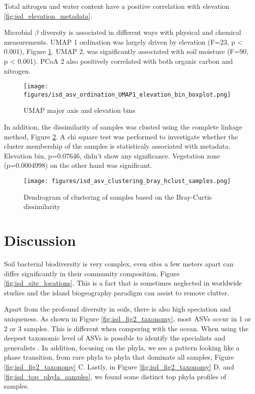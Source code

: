 Total nitrogen and water content have a positive correlation with elevation \ref{fig:isd_elevation_metadata}. 

Microbial $\beta$ diversity is associated in different ways with physical and chemical
measurements. UMAP 1 ordination was largely driven by
elevation (F=23, p < 0.001), Figure \ref{fig:isd_elevation_umap1}. 
UMAP 2,
was significantly associated with soil moisture (F=90, p < 0.001).
PCoA 2 also positively correlated with both organic carbon and nitrogen.

\begin{figure}[hbt!]
      \centering
      \texttt{[image: figures/isd\_asv\_ordination\_UMAP1\_elevation\_bin\_boxplot.png]}
      \caption[Elevation and UMAP1]{UMAP major axis and elevation bins}
      \label{fig:isd_elevation_umap1}
\end{figure}

In addition, the dissimilarity of samples was clusted using the complete linkage method, Figure \ref{fig:isd_samples_dendro}. 
A chi square test was performed to investigate whether the cluster membership of the samples
is statisticaly associated with metadata. Elevation bin, p=0.07646, didn't show any 
significance. Vegetation zone (p=0.0004998) on the other hand was significant.

\begin{figure}[!hbt]
      \centering
      \texttt{[image: figures/isd\_asv\_clustering\_bray\_hclust\_samples.png]}
      \caption[Samples dendrogram]{Dendrogram of clustering of samples based on the Bray-Curtis dissimilarity}
      \label{fig:isd_samples_dendro}
\end{figure}


\section{Discussion}\label{isd_discussion}

Soil bacterial biodiversity is very complex, even sites a few meters apart can differ
significantly in their community composition, Figure \ref{fig:isd_site_locations}.
This is a fact that is sometimes neglected in worldwide studies and the island biogeography
paradigm can assist to remove clutter.

Apart from the profound diversity in soils, there is also high speciation and uniqueness. 
As shown in Figure \ref{fig:isd_fig2_taxonomy}, most ASVs occur in 1 or 2 or 3 samples.
This is different when compering with the ocean. When using the deepest taxonomic
level of ASVs is possible to identify the specialists and generalists \parencite{Barberan2012}. 
In addition, focusing on the phyla, we see a pattern looking like a phase transition, from 
rare phyla to phyla that dominate all samples, Figure \ref{fig:isd_fig2_taxonomy} C. Lastly, in Figure \ref{fig:isd_fig2_taxonomy} D,
and \ref{fig:isd_top_phyla_samples}, we found some distinct top phyla profiles of samples.

